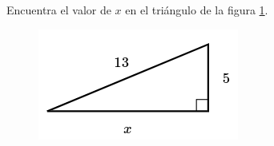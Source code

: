 Encuentra el valor de $x$ en el triángulo de la figura \ref{fig:lados_pitagoras_23}.

\begin{minipage}[t][][t]{0.35\textwidth}
    \begin{figure}[H]
        \centering
        \includegraphics[width=0.9\linewidth]{../images/lados_pitagoras_23.png}
        \caption{}
        \label{fig:lados_pitagoras_23}
    \end{figure}
\end{minipage}\hfill
